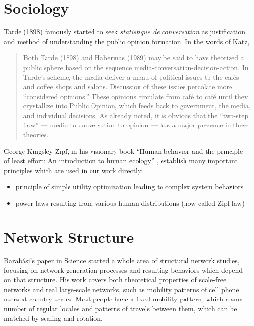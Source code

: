 \documentclass[10pt,oneside]{memoir}
\begin{document}
\begin{Spacing}{2}
\pagebreak \section{Sociology}
\label{sociology}

Tarde (1898) famously started to seek {\itshape statistique de conversation}  as justification and method of understanding the public opinion formation.  In the words of Katz,


\begin{quote}
Both Tarde (1898) \cite{tarde1969communication} and Habermas (1989) \cite{habermas1989structural} may be said to have theorized a public sphere based on the sequence media-conversation-decision-action.  In Tarde's scheme, the media deliver a menu of political issues to the cafés and coffee shops and salons.  Discussion of these issues percolate more ``considered opinions.''  These opinions circulate from café to café until they crystallize into Public Opinion, which feeds back to government, the media, and individual decisions.  As already noted, it is obvious that the ``two-step flow'' --- media to conversation to opinion --- has a major presence in these theories. 
\end{quote}


George Kingsley Zipf, in his visionary book ``Human behavior and the principle of least effort: An introduction to human ecology'' \cite{zipf1949humanbehavior}, establish many important principles which are used in our work directly:


\begin{itemize}


\item principle of simple utility optimization leading to complex system behaviors

\item power laws resulting from various human distributions (now called Zipf law)
\end{itemize}

\pagebreak \section{Network Structure}
\label{networkstructure}

Barabási's paper in Science \cite{barabasi1999scaling} started a whole area of structural network studies, focusing on network generation processes and resulting behaviors which depend on that structure.  His work covers both theoretical properties of scale-free networks and real large-scale networks, such as mobility patterns of cell phone users at country scales.  Most people have a fixed mobility pattern, which a small number of regular locales and patterns of travels between them, which can be matched by scaling and rotation.



\end{Spacing}
\end{document}

